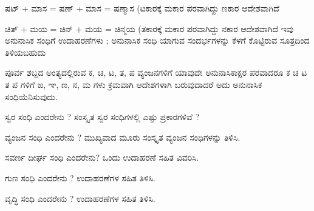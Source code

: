 \indent ಷಟ್ + ಮಾಸ = ಷಣ್ + ಮಾಸ = ಷಣ್ಮಾಸ (ಟಕಾರಕ್ಕೆ ಮಕಾರ ಪರವಾಗಿದ್ದು ಣಕಾರ ಆದೇಶವಾಗಿದೆ\par

\indent ಚಿತ್ + ಮಯ = ಚಿನ್ + ಮಯ = ಚಿನ್ಮಯ (ತಕಾರಕ್ಕೆ ಮಕಾರ ಪರವಾಗಿದ್ದು ನಕಾರ ಆದೇಶವಾಗಿದೆ ಇವು ಅನುನಾಸಿಕ ಸಂಧಿಗೆ ಉದಾಹರಣೆಗಳು ; ಅನುನಾಸಿಕ ಸಂಧಿ ಯಾಗುವ ಸಂದರ್ಭಗಳನ್ನು ಕೆಳಗೆ ಕೊಟ್ಟಿರುವ ಸೂತ್ರದಿಂದ ತಿಳಿಯಬಹುದು\par

\begin{kbvrule}
\hspace{0.5em}ಪೂರ್ವ ಶಬ್ದದ ಅಂತ್ಯದಲ್ಲಿರುವ ಕ, ಚ, ಟ, ತ, ಪ ವ್ಯಂಜನಗಳಿಗೆ ಯಾವುದೇ ಅನುನಾಸಿಕಾಕ್ಷರ ಪರವಾದರೂ ಕ ಚ ಟ ತ ಪ ಗಳಿಗೆ ಙ, ಞ, ಣ, ನ, ಮ ಗಳು ಕ್ರಮವಾಗಿ ಆದೇಶಗಳಾಗಿ ಬರುವುದಾದರೆ ಅದು ಅನುನಾಸಿಕ ಸಂಧಿಯೆನಿಸುವುದು.
\end{kbvrule}


\vspace{2.5pt plus 3pt minus 0.5pt}\noindent\hspace*{1.2em}\kbvnum{{[}1{]}}\hspace{0.55em}ಸ್ವರ ಸಂಧಿ ಎಂದರೇನು ? ಸಂಸ್ಕೃತ ಸ್ವರ ಸಂಧಿಗಳಲ್ಲಿ ಎಷ್ಟು ಪ್ರಕಾರಗಳಿವೆ ?\par

\vspace{2.5pt plus 3pt minus 0.5pt}\noindent\hspace*{1.2em}\kbvnum{{[}2{]}}\hspace{0.55em}ವ್ಯಂಜನ ಸಂಧಿ ಎಂದರೇನು ? ಮುಖ್ಯವಾದ ಮೂರು ಸಂಸ್ಕೃತ ವ್ಯಂಜನ ಸಂಧಿಗಳನ್ನು ತಿಳಿಸಿ.\par

\vspace{2.5pt plus 3pt minus 0.5pt}\noindent\hspace*{1.2em}\kbvnum{{[}3{]}}\hspace{0.55em}ಸವರ್ಣ ದೀರ್ಘ ಸಂಧಿ ಎಂದರೇನು? ಒಂದು ಉದಾಹರಣೆ ಸಹಿತ ವಿವರಿಸಿ.\par

\vspace{2.5pt plus 3pt minus 0.5pt}\noindent\hspace*{1.2em}\kbvnum{{[}4{]}}\hspace{0.55em}ಗುಣ ಸಂಧಿ ಎಂದರೇನು ? ಉದಾಹರಣೆಗಳ ಸಹಿತ ತಿಳಿಸಿ.\par

\vspace{2.5pt plus 3pt minus 0.5pt}\noindent\hspace*{1.2em}\kbvnum{{[}5{]}}\hspace{0.55em}ವೃದ್ಧಿ ಸಂಧಿ ಎಂದರೇನು ? ಉದಾಹರಣೆಗಳ ಸಹಿತ ತಿಳಿಸಿ.\par

